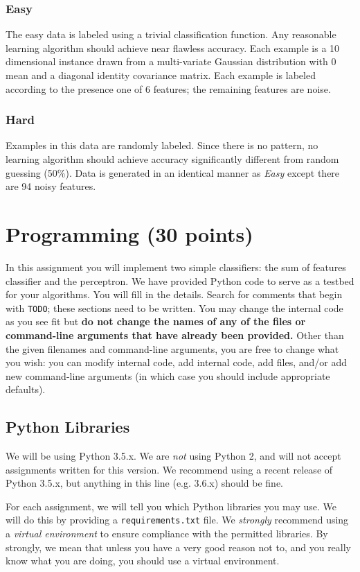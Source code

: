 \documentclass[11pt]{article}
\begin{document}
	\subsubsection{Easy}
	The easy data is labeled using a trivial classification function. Any reasonable learning algorithm should achieve near flawless accuracy. Each example is a 10 dimensional instance drawn from a multi-variate Gaussian distribution with 0 mean and a diagonal identity covariance matrix. Each example is labeled according to the presence one of 6 features; the remaining features are noise.
	
	\subsubsection{Hard}
	Examples in this data are randomly labeled. Since there is no pattern, no learning algorithm should achieve accuracy significantly different from random guessing (50\%). Data is generated in an identical manner as \emph{Easy} except there are 94 noisy features.
	
	\section{Programming (30 points)}
	In this assignment you will implement two simple classifiers: the sum of features classifier and the perceptron. We have provided Python code to serve as a testbed for your algorithms. You will fill in the details. Search for comments that begin with {\tt TODO}; these sections need to be written. You may change the internal code as you see fit but \textbf{do not change the names of any of the files or command-line arguments that have already been provided.} Other than the given filenames and command-line arguments, you are free to change what you wish: you can modify internal code, add internal code, add files, and/or add new command-line arguments (in which case you should include appropriate defaults).
	
	\subsection{Python Libraries}
	We will be using Python 3.5.x. We are {\em not} using Python 2, and will not accept assignments written for this version. We recommend using a recent release of Python 3.5.x, but anything in this line (e.g. 3.6.x) should be fine.
	
	For each assignment, we will tell you which Python libraries you may use. We will do this by providing a {\tt requirements.txt} file. We {\em strongly} recommend using a \emph{virtual environment} to ensure compliance with the permitted libraries. By strongly, we mean that unless you have a very good reason not to, and you really know what you are doing, you should use a virtual environment.
	
\end{document}
